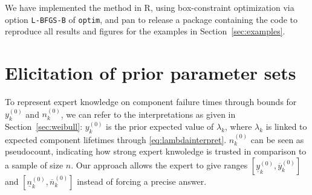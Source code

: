 \documentclass[Journal,SectionNumbers,SingleSpace,InsideFigs]{ascelike}
\newcommand{\mbf}[1]{\mathbf{#1}}
\newcommand{\uz}{^{(0)}} %
\newcommand{\un}{^{(n)}} %
\newcommand{\ul}[1]{\underline{#1}}
\newcommand{\ol}[1]{\overline{#1}}
\def\Tsys{T_\text{sys}}
\def\ykz{y\uz_k}
\def\ykn{y\un_k}
\def\ykzl{\ul{y}\uz_k}
\def\ykzu{\ol{y}\uz_k}
\def\nkz{n\uz_k}
\def\nkn{n\un_k}
\def\nkzl{\ul{n}\uz_k}
\def\nkzu{\ol{n}\uz_k}
\def\tnow{t_\text{now}}
\begin{document}
\iffalse %
\begin{linenomath*}
\begin{align}
\lefteqn{P(\Tsys > t\mid\{\nkz,\ykz, \mbf{t}^k_{e_k;n_k}\}_{k=1}^K)} \\
 &= \sum_{l_1=0}^{n_1-e_1} \cdots \sum_{l_K=0}^{n_K-e_K} \Phi(l_1,\ldots,l_K) \prod_{k=1}^K
    P(C^k_t = l_k\mid\nkz,\ykz, \mbf{t}^k_{e_k;n_k}) \\
 &= \sum_{l_1=0}^{n_1-e_1} \cdots \sum_{l_K=0}^{n_K-e_K} \Phi(l_1,\ldots,l_K) \prod_{k=1}^K
    \sum_{j=0}^{n_k-e_k-l_k} (-1)^j \frac{(n_k - e_k)!}{l_k! j! (n_k - e_k - l_k - j)!} \times \\ & \hspace*{45ex}
    \left(\frac{\nkn\ykn}{\nkn\ykn + (l_k + j) (t^\kappa - (\tnow)^\kappa)}\right)^{\nkn + 1} \\
 &= \sum_{l_1=0}^{n_1-e_1} \cdots \sum_{l_K=0}^{n_K-e_K} \Phi(l_1,\ldots,l_K) \prod_{k=1}^K \label{eq:30}
    \sum_{j=0}^{n_k-e_k-l_k} (-1)^j \frac{(n_k - e_k)!}{l_k! j! (n_k - e_k - l_k - j)!} \times \\ & \hspace*{17ex}
    \left(\frac{\nkz\ykz + \sum_{i=1}^{e_k} (t_i^k)^\kappa + (n_k-e_k) (\tnow)^\kappa }%
               {\nkz\ykz + \sum_{i=1}^{e_k} (t_i^k)^\kappa + (n_k-e_k-l_k-j) (\tnow)^\kappa + (l_k + j) t^\kappa }\right)^{%
    \nkz + e_k + 1} 
\end{align}
\end{linenomath*}
\fi %

We have implemented the method in \textsf{R},
using box-constraint optimization via option \texttt{L-BFGS-B} of \texttt{optim},
and pan to release a package containing the code to reproduce all results and figures
for the examples in Section~\ref{sec:examples}.


\section{Elicitation of prior parameter sets}
\label{sec:elicitation}

To represent expert knowledge on component failure times
through bounds for $\ykz$ and $\nkz$,
we can refer to the interpretations as given in Section~\ref{sec:weibull}:
$\ykz$ is the prior expected value of $\lambda_k$,
where $\lambda_k$ is linked to expected component lifetimes through \eqref{eq:lambdainterpret}.
$\nkz$ can be seen as pseudocount, indicating how strong expert knwoledge is trusted
in comparison to a sample of size $n$.
Our approach allows the expert to give ranges $[\ykzl, \ykzu]$ and $[\nkzl, \nkzu]$
instead of forcing a precise answer.
\end{document}
